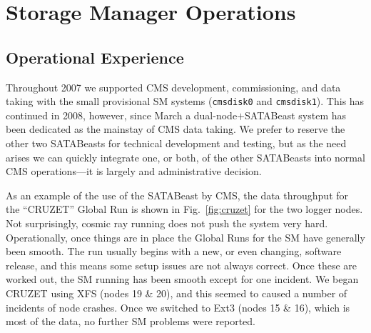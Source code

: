 
\section{Storage Manager Operations\label{sec:SMoperations}}

\subsection{Operational Experience \label{sec:SMexperience}}

Throughout 2007 we supported CMS development, commissioning, and data taking
with the small provisional SM systems (\verb+cmsdisk0+ and \verb+cmsdisk1+).
This has continued in 2008, however,
since March a dual-node$+$SATABeast system has been dedicated
as the mainstay of CMS data taking.
We prefer to reserve the other two SATABeasts for technical development
and testing, but as the need arises we can quickly integrate one, or both,
of the other SATABeasts into normal CMS operations---it is largely and 
administrative decision.

As an example of the use of the SATABeast by CMS,
the data throughput for the ``CRUZET'' Global Run is shown in Fig.~\ref{fig:cruzet}
for the two logger nodes.
Not surprisingly, cosmic ray running does not push the system very hard.
Operationally, once things are in place the Global Runs for the SM have
generally been smooth.
The run usually begins with a new, or even changing, software release,
and this means some setup issues are not always correct.
Once these are worked out, the SM running has been smooth except for one incident.
We began CRUZET using XFS (nodes 19 \& 20), and this seemed to caused a number
of incidents of node crashes.
Once we switched to Ext3 (nodes 15 \& 16), which is most of the data, 
no further SM problems were reported.

